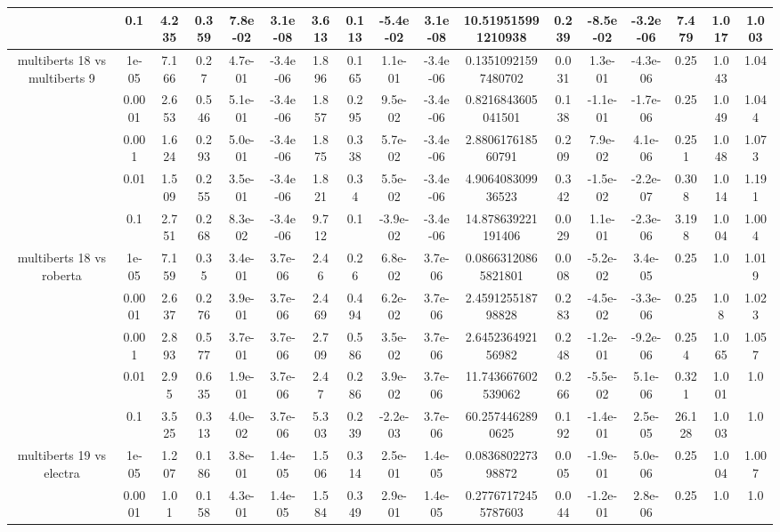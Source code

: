 \begin{tabular}{|c|c|c|c|c|c|c|c|c|c|c|c|c|c|c|c|c|}
 & 0.1 & 4.235 & 0.359 & 7.8e-02 & 3.1e-08 & 3.613 & 0.113 & -5.4e-02 & 3.1e-08 & 10.519515991210938 & 0.239 & -8.5e-02 & -3.2e-06 & 7.479 & 1.017 & 1.003 \\
\hline
\multirow{5}{*}{multiberts 18 vs multiberts 9} & 1e-05 & 7.166 & 0.27 & 4.7e-01 & -3.4e-06 & 1.896 & 0.165 & 1.1e-01 & -3.4e-06 & 0.13510921597480702 & 0.031 & 1.3e-01 & -4.3e-06 & 0.25 & 1.043 & 1.04 \\
 & 0.0001 & 2.653 & 0.546 & 5.1e-01 & -3.4e-06 & 1.857 & 0.295 & 9.5e-02 & -3.4e-06 & 0.8216843605041501 & 0.138 & -1.1e-01 & -1.7e-06 & 0.25 & 1.049 & 1.044 \\
 & 0.001 & 1.624 & 0.293 & 5.0e-01 & -3.4e-06 & 1.875 & 0.338 & 5.7e-02 & -3.4e-06 & 2.880617618560791 & 0.209 & 7.9e-02 & 4.1e-06 & 0.251 & 1.048 & 1.073 \\
 & 0.01 & 1.509 & 0.255 & 3.5e-01 & -3.4e-06 & 1.821 & 0.34 & 5.5e-02 & -3.4e-06 & 4.906408309936523 & 0.342 & -1.5e-02 & -2.2e-07 & 0.308 & 1.014 & 1.191 \\
 & 0.1 & 2.751 & 0.268 & 8.3e-02 & -3.4e-06 & 9.712 & 0.1 & -3.9e-02 & -3.4e-06 & 14.878639221191406 & 0.029 & 1.1e-01 & -2.3e-06 & 3.198 & 1.004 & 1.004 \\
\hline
\multirow{5}{*}{multiberts 18 vs roberta } & 1e-05 & 7.159 & 0.35 & 3.4e-01 & 3.7e-06 & 2.46 & 0.26 & 6.8e-02 & 3.7e-06 & 0.08663120865821801 & 0.008 & -5.2e-02 & 3.4e-05 & 0.25 & 1.0 & 1.019 \\
 & 0.0001 & 2.637 & 0.276 & 3.9e-01 & 3.7e-06 & 2.469 & 0.494 & 6.2e-02 & 3.7e-06 & 2.459125518798828 & 0.283 & -4.5e-02 & -3.3e-06 & 0.25 & 1.08 & 1.023 \\
 & 0.001 & 2.893 & 0.577 & 3.7e-01 & 3.7e-06 & 2.709 & 0.586 & 3.5e-02 & 3.7e-06 & 2.645236492156982 & 0.248 & -1.2e-01 & -9.2e-06 & 0.254 & 1.065 & 1.057 \\
 & 0.01 & 2.95 & 0.635 & 1.9e-01 & 3.7e-06 & 2.47 & 0.286 & 3.9e-02 & 3.7e-06 & 11.743667602539062 & 0.266 & -5.5e-02 & 5.1e-06 & 0.321 & 1.001 & 1.0 \\
 & 0.1 & 3.525 & 0.313 & 4.0e-02 & 3.7e-06 & 5.303 & 0.239 & -2.2e-03 & 3.7e-06 & 60.2574462890625 & 0.192 & -1.4e-01 & 2.5e-05 & 26.128 & 1.003 & 1.0 \\
\hline
\multirow{5}{*}{multiberts 19 vs electra } & 1e-05 & 1.207 & 0.186 & 3.8e-01 & 1.4e-05 & 1.506 & 0.314 & 2.5e-01 & 1.4e-05 & 0.083680227398872 & 0.005 & -1.9e-01 & 5.0e-06 & 0.25 & 1.004 & 1.007 \\
 & 0.0001 & 1.01 & 0.158 & 4.3e-01 & 1.4e-05 & 1.584 & 0.349 & 2.9e-01 & 1.4e-05 & 0.27767172455787603 & 0.044 & -1.2e-01 & 2.8e-06 & 0.25 & 1.0 & 1.0 \\

\end{tabular}
